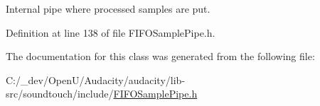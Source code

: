 Internal pipe where processed samples are put. 



Definition at line 138 of file F\+I\+F\+O\+Sample\+Pipe.\+h.



The documentation for this class was generated from the following file\+:\begin{DoxyCompactItemize}
\item 
C\+:/\+\_\+dev/\+Open\+U/\+Audacity/audacity/lib-\/src/soundtouch/include/\hyperlink{_f_i_f_o_sample_pipe_8h}{F\+I\+F\+O\+Sample\+Pipe.\+h}\end{DoxyCompactItemize}
